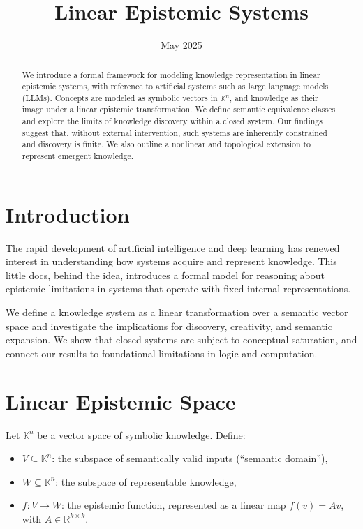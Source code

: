 \documentclass[11pt]{article}
\title{Linear Epistemic Systems}
\date{May 2025}
\begin{document}
    \maketitle

    \begin{abstract}
        We introduce a formal framework for modeling knowledge representation in linear epistemic systems, with reference to artificial systems such as large language models (LLMs). Concepts are modeled as symbolic vectors in $\mathbb{K}^n$, and knowledge as their image under a linear epistemic transformation. We define semantic equivalence classes and explore the limits of knowledge discovery within a closed system. Our findings suggest that, without external intervention, such systems are inherently constrained and discovery is finite. We also outline a nonlinear and topological extension to represent emergent knowledge.
    \end{abstract}

    \section{Introduction}

    The rapid development of artificial intelligence and deep learning has renewed interest in understanding how systems acquire and represent knowledge. This little docs, behind the idea, introduces a formal model for reasoning about epistemic limitations in systems that operate with fixed internal representations.

    We define a knowledge system as a linear transformation over a semantic vector space and investigate the implications for discovery, creativity, and semantic expansion. We show that closed systems are subject to conceptual saturation, and connect our results to foundational limitations in logic and computation.

    \section{Linear Epistemic Space}

    Let $\mathbb{K}^n$ be a vector space of symbolic knowledge. Define:

    \begin{itemize}[noitemsep]
        \item $V \subseteq \mathbb{K}^n$: the subspace of semantically valid inputs (``semantic domain''),
        \item $W \subseteq \mathbb{K}^n$: the subspace of representable knowledge,
        \item $f : V \to W$: the epistemic function, represented as a linear map $f(v) = Av$, with $A \in \mathbb{R}^{k \times k}$.
    \end{itemize}
\end{document}
